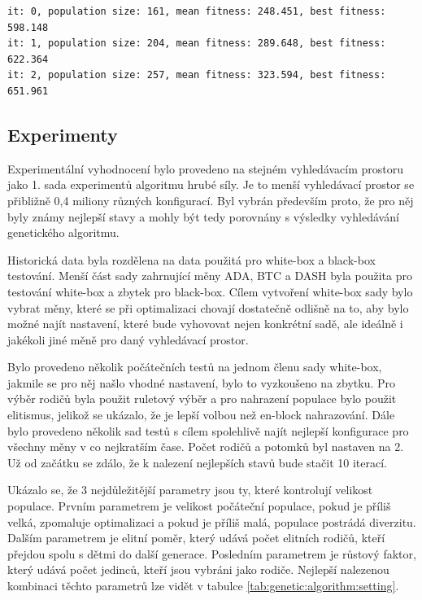 \begin{lstlisting}[caption={~Rozšíření logu pro genetický algoritmus},label={lst:genetic:algorithm:log},captionpos=t,abovecaptionskip=-\medskipamount,belowcaptionskip=\medskipamount]
it: 0, population size: 161, mean fitness: 248.451, best fitness: 598.148
it: 1, population size: 204, mean fitness: 289.648, best fitness: 622.364
it: 2, population size: 257, mean fitness: 323.594, best fitness: 651.961
\end{lstlisting}

\subsection{Experimenty}
Experimentální vyhodnocení bylo provedeno na stejném vyhledávacím prostoru jako 1. sada experimentů algoritmu hrubé síly.
Je to menší vyhledávací prostor se přibližně 0,4 miliony různých konfigurací.
Byl vybrán především proto, že pro něj byly známy nejlepší stavy a mohly být tedy porovnány s výsledky vyhledávání genetického algoritmu.

Historická data byla rozdělena na data použitá pro white-box a black-box testování.
Menší část sady zahrnující měny ADA, BTC a DASH byla použita pro testování white-box a zbytek pro black-box.
Cílem vytvoření white-box sady bylo vybrat měny, které se při optimalizaci chovají dostatečně odlišně na to, aby bylo možné najít nastavení, které bude vyhovovat nejen konkrétní sadě, ale ideálně i jakékoli jiné měně pro daný vyhledávací prostor.

Bylo provedeno několik počátečních testů na jednom členu sady white-box, jakmile se pro něj našlo vhodné nastavení, bylo to vyzkoušeno na zbytku.
Pro výběr rodičů byla použit ruletový výběr a pro nahrazení populace bylo použit elitismus, jelikož se ukázalo, že je lepší volbou než en-block nahrazování.
Dále bylo provedeno několik sad testů s cílem spolehlivě najít nejlepší konfigurace pro všechny měny v co nejkratším čase.
Počet rodičů a potomků byl nastaven na 2.
Už od začátku se zdálo, že k nalezení nejlepších stavů bude stačit 10 iterací.

Ukázalo se, že 3 nejdůležitější parametry jsou ty, které kontrolují velikost populace.
Prvním parametrem je velikost počáteční populace, pokud je příliš velká, zpomaluje optimalizaci a pokud je příliš malá, populace postrádá diverzitu.
Dalším parametrem je elitní poměr, který udává počet elitních rodičů, kteří přejdou spolu s dětmi do další generace.
Posledním parametrem je růstový faktor, který udává počet jedinců, kteří jsou vybráni jako rodiče.
Nejlepší nalezenou kombinaci těchto parametrů lze vidět v tabulce \ref{tab:genetic:algorithm:setting}.

